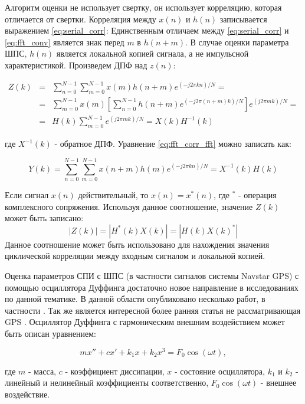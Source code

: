 Алгоритм оценки не использует свертку, он использует корреляцию, которая отличается от свертки. Корреляция
между $x(n)$ и $h(n)$ записывается выражением \ref{eq:serial_corr}:
Единственным отличаем между \ref{eq:serial_corr} и \ref{eq:fft_conv} является знак перед $m$ в ${h(n+m)}$.
В случае оценки параметра ШПС, $h(n)$ является локальной копией сигнала, а не импульсной характеристикой.
Произведем ДПФ над $z(n)$:
\begin{center}
\begin{eqnarray}
	\label{eq:fft_corr_fft}
	Z(k) & = & \sum\limits_{n=0}^{N-1}\sum\limits_{m=0}^{N-1}{x(m)h(n+m)e^{(-j2\pi{kn})/N}}=\nonumber \\
	& = & \sum\limits_{m=0}^{N-1}{x(m)}[\sum\limits_{n=0}^{N-1}h(n+m)e^{(-j2\pi{(n+m)}k)/N}]e^{(j2\pi{m}k)/N}=\\
	& = & H(k)\sum\limits_{m=0}^{N-1}e^{(j2\pi{m}k)/N} = X(k)H^{-1}(k)\nonumber 
\end{eqnarray}
\end{center}
где ${X^{-1}(k)}$ - обратное ДПФ. Уравнение \ref{eq:fft_corr_fft} можно записать как:

\begin{equation}
	\label{eq:fft_corr_fft_rev}
	Y(k) = \sum\limits_{n=0}^{N-1}\sum\limits_{m=0}^{N-1}{x(n+m)h(m)e^{(-j2\pi{kn})/N}}=X^{-1}(k)H(k)
\end{equation}

Если сигнал $x(n)$ действительный, то $x(n) = x^*(n)$, где ${^*}$ - операция комплексного сопряжения. Используя данное соотношение,
значение $Z(k)$ может быть записано:
\begin{equation}
	\label{eq:fft_magnitude}
	|Z(k)|=|H^*(k)X(k)|=|H(k)X(k)^*|
\end{equation}
Данное соотношение может быть использовано для нахождения значения циклической корреляции между входным сигналом и 
локальной копией.

Оценка параметров СПИ с ШПС (в частности сигналов системы Navstar GPS) с помощью осциллятора Дуффинга
достаточно новое направление в исследованиях по данной тематике. В данной области опубликовано несколько работ, в частности \cite{chaos_chen, chaos_cambridge, chaos_huang, chaos_song}.
Так же является интересной более ранняя статья не рассматривающая GPS \cite{chaos_wang}.
Осциллятор Дуффинга с гармоническим внешним воздействием может быть описан уравнением:
\begin{center}
\begin{equation}
	\label{eq:duffing}
	mx'' + cx' + k_{1}x + k_{2}x^3 = F_{0}\cos(\omega{t}),
\end{equation}
\end{center}
где $m$ - масса, $c$ - коэффициент диссипации, $x$ - состояние осциллятора, $k_1$ и $k_2$ - линейный и нелинейный коэффициенты соответственно,
$F_{0}\cos(\omega{t})$ - внешнее воздействие.

